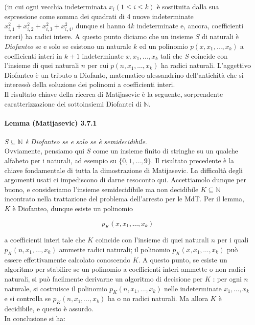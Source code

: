 (in cui ogni vecchia indeterminata $x_i(1 \leq i \leq k)$ è sostituita dalla sua
espressione come somma dei quadrati di 4 nuove indeterminate $x_{i, 1}^2+x_{i,
    2}^2+x_{i, 3}^2+x_{i, 4}^2$, dunque si hanno $4 k$ indeterminate e, ancora,
coefficienti interi) ha radici intere. A questo punto diciamo che un insieme $S$ di
naturali è \textit{Diofanteo} se e solo se esistono un naturale $k$ ed un polinomio $p\left(x,
    x_1, \ldots, x_k\right)$ a coefficienti interi in $k+1$ indeterminate $x, x_1,
    \ldots, x_k$ tali che $S$ coincide con l'insieme di quei naturali $n$ per cui
$p\left(n, x_1, \ldots, x_k\right)$ ha radici naturali. L'aggettivo Diofanteo è un
tributo a Diofanto, matematico alessandrino dell'antichità che si interessò della
soluzione dei polinomi a coefficienti interi.\\
Il risultato chiave della ricerca di
Matijasevic è la seguente, sorprendente caratterizzazione dei sottoinsiemi Diofantei
di $\mathbb{N}$.

\paragraph{Lemma (Matijasevic) 3.7.1} \textit{$S \subseteq \mathbb{N}$ è Diofanteo
    se e solo se è semidecidibile.}\\

Ovviamente, pensiamo qui $S$ come un insieme finito di
stringhe su un qualche alfabeto per i naturali, ad esempio su $\{0,1, \ldots, 9\}$.
Il risultato precedente è la chiave fondamentale di tutta la dimostrazione di
Matijasevic. La difficoltà degli argomenti usati ci impediscono di darne resoconto
qui.
Accettiamolo dunque per buono, e consideriamo l'insieme semidecidibile ma non
decidibile $K \subseteq \mathbb{N}$ incontrato nella trattazione del problema
dell'arresto per le MdT. Per il lemma, $K$ è Diofanteo, dunque esiste un polinomio

\[
    p_K\left(x, x_1, \ldots, x_k\right)
\]

a coefficienti interi tale che $K$ coincide con l'insieme di quei naturali $n$ per i
quali $p_K\left(n, x_1, \ldots, x_k\right)$ ammette radici naturali; il polinomio
$p_K\left(x, x_1, \ldots, x_k\right)$ può essere effettivamente calcolato conoscendo
$K$. A questo punto, se esiste un algoritmo per stabilire se un polinomio a
coefficienti interi ammette o non radici naturali, si può facilmente derivarne un
algoritmo di decisione per $K$ : per ogni $n$ naturale, si costruisce il polinomio
$p_K\left(n, x_1, \ldots, x_k\right)$ nelle indeterminate $x_1, \ldots, x_k$ e si
controlla se $p_K\left(n, x_1, \ldots, x_k\right)$ ha o no radici naturali. Ma allora
$K$ è decidibile, e questo è assurdo.\\
In conclusione si ha:

